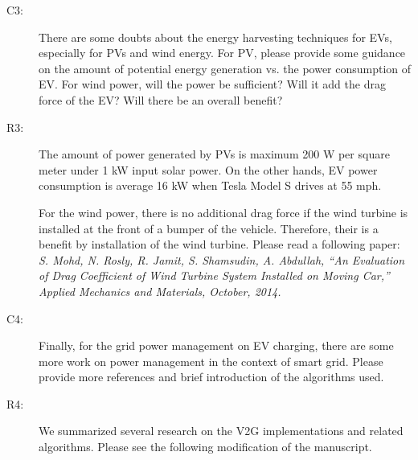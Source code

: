 \documentclass[onecolumn]{IEEEconf}
\begin{document}
\begin{description}
\item [C3: ] There are some doubts about the energy harvesting techniques for EVs, especially for PVs and wind energy. For PV, please provide some guidance on the amount of potential energy generation vs. the power consumption of EV. For wind power, will the power be sufficient? Will it add the drag force of the EV? Will there be an overall benefit?
\item [R3: ] The amount of power generated by PVs is maximum 200 W per square meter under 1 kW input solar power. On the other hands, EV power consumption is average 16 kW when Tesla Model S drives at 55 mph.

For the wind power, there is no additional drag force if the wind turbine is installed at the front of a bumper of the vehicle. Therefore, their is a benefit by installation of the wind turbine. Please read a following paper:\\

\textit{S. Mohd, N. Rosly, R. Jamit, S. Shamsudin, A. Abdullah, ``An Evaluation of Drag Coefficient of Wind Turbine System Installed on Moving Car,'' Applied Mechanics and Materials, October, 2014.}
~\\

\item [C4: ] Finally, for the grid power management on EV charging, there are some more work on power management in the context of smart grid. Please provide more references and brief introduction of the algorithms used.
\item [R4: ] We summarized several research on the V2G implementations and related algorithms. Please see the following modification of the manuscript.\\


\end{description}
\end{document}
